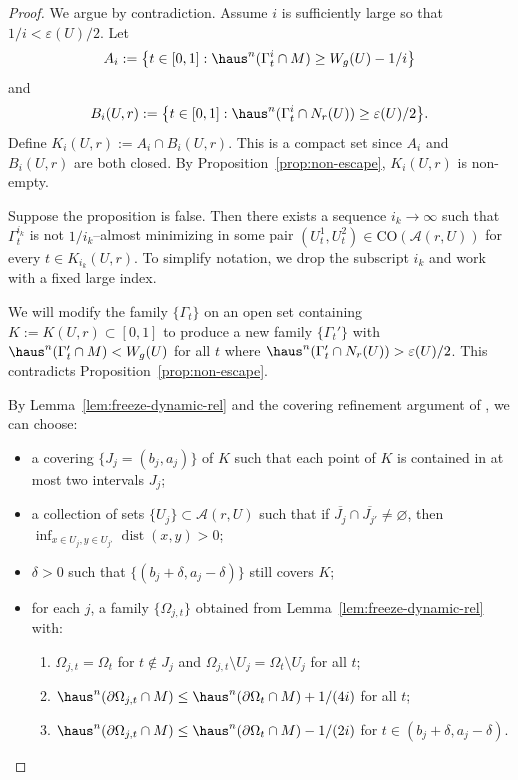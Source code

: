 \begin{proof}
We argue by contradiction. Assume $i$ is sufficiently large so that $1/i<\varepsilon(U)/2$. Let
\[
A_i:=\bigl\{t\in[0,1]:\haus^n(\Gamma_t^i\cap M)\ge W_g(U)-1/i\bigr\}
\]
and
\[
B_i(U,r):=\bigl\{t\in[0,1]:\haus^n(\Gamma_t^i\cap N_r(U))\ge \varepsilon(U)/2\bigr\}.
\]
Define $K_i(U,r):=A_i\cap B_i(U,r)$. This is a compact set since $A_i$ and $B_i(U,r)$ are both closed. By Proposition~\ref{prop:non-escape}, $K_i(U,r)$ is non-empty.

Suppose the proposition is false. Then there exists a sequence $i_k\to\infty$ such that $\Gamma_t^{i_k}$ is not $1/i_k$--almost minimizing in some pair $(U_t^1,U_t^2)\in\mathrm{CO}(\mathcal{A}(r,U))$ for every $t\in K_{i_k}(U,r)$. To simplify notation, we drop the subscript $i_k$ and work with a fixed large index.

We will modify the family $\{\Gamma_t\}$ on an open set containing $K:=K(U,r)\subset[0,1]$ to produce a new family $\{\Gamma_t'\}$ with $\haus^n(\Gamma_t'\cap M)<W_g(U)$ for all $t$ where $\haus^n(\Gamma_t'\cap N_r(U))>\varepsilon(U)/2$. This contradicts Proposition~\ref{prop:non-escape}.

By Lemma~\ref{lem:freeze-dynamic-rel} and the covering refinement argument of \cite[page~13]{DLT13}, we can choose:
\begin{itemize}
    \item a covering $\{J_j=(b_j,a_j)\}$ of $K$ such that each point of $K$ is contained in at most two intervals $J_j$;
    \item a collection of sets $\{U_j\}\subset\mathcal{A}(r,U)$ such that if $\overline{J_j}\cap\overline{J_{j'}}\neq\varnothing$, then $\inf_{x\in U_j,y\in U_{j'}}\operatorname{dist}(x,y)>0$;
    \item $\delta>0$ such that $\{(b_j+\delta,a_j-\delta)\}$ still covers $K$;
    \item for each $j$, a family $\{\Omega_{j,t}\}$ obtained from Lemma~\ref{lem:freeze-dynamic-rel} with:
    \begin{enumerate}[label=(\alph*)]
        \item $\Omega_{j,t}=\Omega_t$ for $t\notin J_j$ and $\Omega_{j,t}\setminus U_j=\Omega_t\setminus U_j$ for all $t$;
        \item $\haus^n(\partial\Omega_{j,t}\cap M)\le \haus^n(\partial\Omega_t\cap M)+1/(4i)$ for all $t$;
        \item $\haus^n(\partial\Omega_{j,t}\cap M)\le \haus^n(\partial\Omega_t\cap M)-1/(2i)$ for $t\in(b_j+\delta,a_j-\delta)$.
    \end{enumerate}
\end{itemize}


\end{proof}
